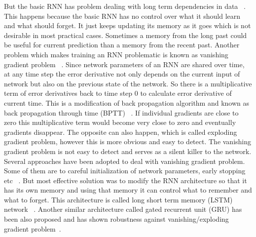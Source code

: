 \documentclass[10pt,twocolumn,letterpaper]{article}
\begin{document}
But the basic RNN has problem dealing with long term dependencies in data ~\cite{DBLP:journals/corr/abs-1211-5063}. This happens because the basic RNN has no control over what it should learn and what should forget. It just keeps updating its memory as it goes which is not desirable in most practical cases. Sometimes a memory from the long past could be useful for current prediction than a memory from the recent past. Another problem which makes training an RNN problematic is known as vanishing gradient problem ~\cite{DBLP:journals/corr/abs-1211-5063}. Since network parameters of an RNN are shared over time, at any time step the error derivative not only depends on the current input of network but also on the previous state of the network. So there is a multiplicative term of error derivatives back to time step $0$ to calculate error derivative of current time. This is a modification of back propagation algorithm and known as back propagation through time (BPTT) ~\cite{58337}. If individual gradients are close to zero this multiplicative term would become very close to zero and eventually gradients disappear. The opposite can also happen, which is called exploding gradient problem, however this is more obvious and easy to detect. The vanishing gradient problem is not easy to detect and serves as a silent killer to the network. Several approaches have been adopted to deal with vanishing gradient problem. Some of them are to careful initialization of network parameters, early stopping etc ~\cite{DBLP:journals/corr/abs-1211-5063}. But most effective solution was to modify the RNN architecture so that it has its own memory and using that memory it can control what to remember and what to forget. This architecture is called long short term memory (LSTM) network ~\cite{Hochreiter:1997:LSM:1246443.1246450}. Another similar architecture called gated recurrent unit (GRU) has been also proposed and has shown robustness against vanishing/exploding gradient problem~\cite{DBLP:journals/corr/ChoMGBSB14}.
\end{document}
